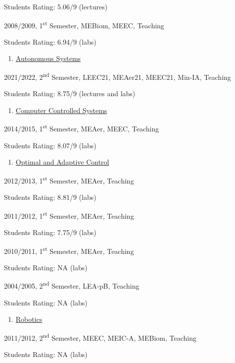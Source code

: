 \documentclass[
]{article}
\begin{document}
Students Rating: 5.06/9 (lectures)

2008/2009, 1\textsuperscript{st} Semester, MEBiom, MEEC, Teaching

Students Rating: 6.94/9 (labs)

\begin{enumerate}
\def\labelenumi{\arabic{enumi}.}
\setcounter{enumi}{4}
\item
  \ul{Autonomous Systems}
\end{enumerate}

2021/2022, 2\textsuperscript{nd} Semester, LEEC21, MEAer21, MEEC21,
Min-IA, Teaching

Students Rating: 8.75/9 (lectures and labs)

\begin{enumerate}
\def\labelenumi{\arabic{enumi}.}
\setcounter{enumi}{5}
\item
  \ul{Computer Controlled Systems}
\end{enumerate}

2014/2015, 1\textsuperscript{st} Semester, MEAer, MEEC, Teaching

Students Rating: 8.07/9 (labs)

\begin{enumerate}
\def\labelenumi{\arabic{enumi}.}
\setcounter{enumi}{6}
\item
  \ul{Optimal and Adaptive Control}
\end{enumerate}

2012/2013, 1\textsuperscript{st} Semester, MEAer, Teaching

Students Rating: 8.81/9 (labs)

2011/2012, 1\textsuperscript{st} Semester, MEAer, Teaching

Students Rating: 7.75/9 (labs)

2010/2011, 1\textsuperscript{st} Semester, MEAer, Teaching

Students Rating: NA (labs)

2004/2005, 2\textsuperscript{nd} Semester, LEA-pB, Teaching

Students Rating: NA (labs)

\begin{enumerate}
\def\labelenumi{\arabic{enumi}.}
\setcounter{enumi}{7}
\item
  \ul{Robotics}
\end{enumerate}

2011/2012, 2\textsuperscript{nd} Semester, MEEC, MEIC-A, MEBiom,
Teaching

Students Rating: NA (labs)
\end{document}
